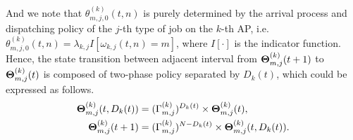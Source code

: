 {    And we note that $\theta^{(k)}_{m,j,0}(t,n)$ is purely determined by the arrival process and dispatching policy of the $j$-th type of job on the $k$-th AP, i.e. $\theta^{(k)}_{m,j,0}(t,n) = \lambda_{k,j} I[\omega_{k,j}(t,n) = m]$, where $I[\cdot]$ is the indicator function.
    Hence, the state transition between adjacent interval from $\boldsymbol{\Theta}^{(k)}_{m,j}(t+1)$ to $\boldsymbol{\Theta}^{(k)}_{m,j}(t)$ is composed of two-phase policy separated by $D_k(t)$, which could be expressed as follows.
    \begin{align}
        \boldsymbol{\Theta}^{(k)}_{m,j}(t, D_{k}(t)) &= (\Gamma^{(k)}_{m,j})^{D_{k}(t)} \times \boldsymbol{\Theta}^{(k)}_{m,j}(t),
        \nonumber\\
        \boldsymbol{\Theta}^{(k)}_{m,j}(t+1) &= (\Gamma^{(k)}_{m,j})^{N-D_{k}(t)} \times \boldsymbol{\Theta}^{(k)}_{m,j}(t, D_{k}(t)).
    \end{align}

}
